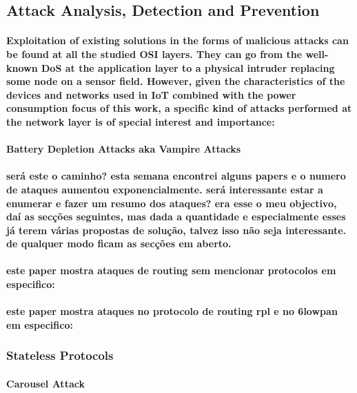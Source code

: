 \subsection{Attack Analysis, Detection and Prevention}
\paragraph{
Exploitation of existing solutions in the forms of malicious attacks can be found at all the studied OSI layers. They can go from the well-known \ac{DoS} at the application layer to a physical intruder replacing some node on a sensor field. However, given the characteristics of the devices and networks used in \ac{IoT} combined with the power consumption focus of this work, a specific kind of attacks performed at the network layer is of special interest and importance:
}

\paragraph{\textbf{Battery Depletion Attacks aka Vampire Attacks}}
\paragraph{
	será este o caminho?
	esta semana encontrei alguns papers e o numero de ataques aumentou exponencialmente. será interessante estar a enumerar e fazer um resumo dos ataques? era esse o meu objectivo, daí as secções seguintes, mas dada a quantidade e especialmente esses já terem várias propostas de solução, talvez isso não seja interessante. de qualquer modo ficam as secções em aberto.
}

\paragraph{este paper mostra ataques de routing sem mencionar protocolos em especifico: \cite{Vasserman2013,Vanitha2014}}
\paragraph{este paper mostra ataques no protocolo de routing rpl e no 6lowpan em especifico: \cite{Pongle2015}}

\subsubsection{Stateless Protocols}

\paragraph{\textbf{Carousel Attack}}


